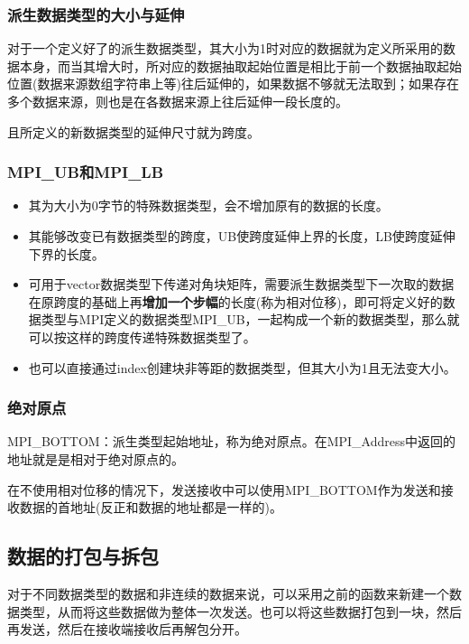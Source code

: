 \documentclass[UTF8]{article}%
\begin{document}
\subsubsection{派生数据类型的大小与延伸}

对于一个定义好了的派生数据类型，其大小为1时对应的数据就为定义所采用的数据本身，而当其增大时，所对应的数据抽取起始位置是相比于前一个数据抽取起始位置(数据来源数组字符串上等)往后延伸的，如果数据不够就无法取到；如果存在多个数据来源，则也是在各数据来源上往后延伸一段长度的。

且所定义的新数据类型的延伸尺寸就为跨度。

\subsubsection{MPI\_UB和MPI\_LB}

\begin{itemize}
    \item 其为大小为0字节的特殊数据类型，会不增加原有的数据的长度。
    \item 其能够改变已有数据类型的跨度，UB使跨度延伸上界的长度，LB使跨度延伸下界的长度。
    \item 可用于vector数据类型下传递对角块矩阵，需要派生数据类型下一次取的数据在原跨度的基础上再\textbf{增加一个步幅}的长度(称为相对位移)，即可将定义好的数据类型与MPI定义的数据类型MPI\_UB，一起构成一个新的数据类型，那么就可以按这样的跨度传递特殊数据类型了。
    \item 也可以直接通过index创建块非等距的数据类型，但其大小为1且无法变大小。
\end{itemize}

\subsubsection{绝对原点}

MPI\_BOTTOM：派生类型起始地址，称为绝对原点。在MPI\_Address中返回的地址就是是相对于绝对原点的。

在不使用相对位移的情况下，发送接收中可以使用MPI\_BOTTOM作为发送和接收数据的首地址(反正和数据的地址都是一样的)。

\subsection{数据的打包与拆包}

对于不同数据类型的数据和非连续的数据来说，可以采用之前的函数来新建一个数据类型，从而将这些数据做为整体一次发送。也可以将这些数据打包到一块，然后再发送，然后在接收端接收后再解包分开。
\end{document}
